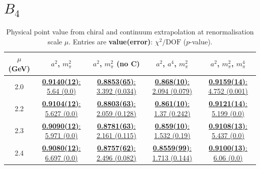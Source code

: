 \documentclass[12pt]{extarticle}
\begin{document}
\section{$B_4$}
\begin{table}[h!]
\begin{center}
\begin{tabular}{|c|c|c|c|c|}
\hline
$\mu$ (GeV) & $a^2$, $m_\pi^2$& $a^2$, $m_\pi^2$ (no C)& $a^2$, $a^4$, $m_\pi^2$& $a^2$, $m_\pi^2$, $m_\pi^4$\\
\hline
2.0& \hyperlink{SSpPP/SUSY/a2m2_20.pdf.1}{\textbf{0.9140(12)}: 5.64 (0.0)} & \hyperlink{SSpPP/SUSY/a2m2noC_20.pdf.1}{\textbf{0.8853(65)}: 3.392 (0.034)} & \hyperlink{SSpPP/SUSY/a2a4m2_20.pdf.1}{\textbf{0.868(10)}: 2.094 (0.079)} & \hyperlink{SSpPP/SUSY/a2m2m4_20.pdf.1}{\textbf{0.9159(14)}: 4.752 (0.001)}\\
2.2& \hyperlink{SSpPP/SUSY/a2m2_22.pdf.1}{\textbf{0.9104(12)}: 5.627 (0.0)} & \hyperlink{SSpPP/SUSY/a2m2noC_22.pdf.1}{\textbf{0.8803(63)}: 2.059 (0.128)} & \hyperlink{SSpPP/SUSY/a2a4m2_22.pdf.1}{\textbf{0.861(10)}: 1.37 (0.242)} & \hyperlink{SSpPP/SUSY/a2m2m4_22.pdf.1}{\textbf{0.9121(14)}: 5.199 (0.0)}\\
2.3& \hyperlink{SSpPP/SUSY/a2m2_23.pdf.1}{\textbf{0.9090(12)}: 5.971 (0.0)} & \hyperlink{SSpPP/SUSY/a2m2noC_23.pdf.1}{\textbf{0.8781(63)}: 2.161 (0.115)} & \hyperlink{SSpPP/SUSY/a2a4m2_23.pdf.1}{\textbf{0.859(10)}: 1.532 (0.19)} & \hyperlink{SSpPP/SUSY/a2m2m4_23.pdf.1}{\textbf{0.9108(13)}: 5.437 (0.0)}\\
2.4& \hyperlink{SSpPP/SUSY/a2m2_24.pdf.1}{\textbf{0.9080(12)}: 6.697 (0.0)} & \hyperlink{SSpPP/SUSY/a2m2noC_24.pdf.1}{\textbf{0.8757(62)}: 2.496 (0.082)} & \hyperlink{SSpPP/SUSY/a2a4m2_24.pdf.1}{\textbf{0.8559(99)}: 1.713 (0.144)} & \hyperlink{SSpPP/SUSY/a2m2m4_24.pdf.1}{\textbf{0.9100(13)}: 6.06 (0.0)}\\
\hline
\end{tabular}
\caption{Physical point value from chiral and continuum extrapolation at renormalisation scale $\mu$. Entries are \textbf{value(error)}: $\chi^2/\text{DOF}$ ($p$-value).}
\end{center}
\end{table}
\end{document}
